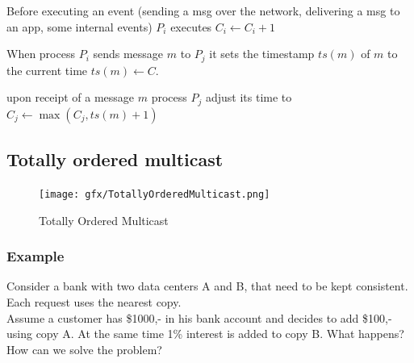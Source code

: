 \documentclass[ngerman,a4paper]{report}
\begin{document}
\begin{compactenum}
\item Before executing an event (sending a msg over the network, delivering a msg to an app, some internal events) $P_i$ executes $C_i \leftarrow C_i + 1$
\item When process $P_i$ sends message $m$ to $P_j$ it sets the timestamp $ts(m)$ of $m$ to the current time $ts(m) \leftarrow C$.
\item upon receipt of a message $m$ process $P_j$ adjust its time to $C_j \leftarrow \max \left({C_j, ts(m)+1}\right)$
\end{compactenum}

\subsection{Totally ordered multicast}

\begin{figure}[h]
	\centering
	\texttt{[image: gfx/TotallyOrderedMulticast.png]}
	\caption{Totally Ordered Multicast}
	\label{img:TotallyOrderedMulticast}
\end{figure}

\subsubsection{Example}

Consider a bank with two data centers A and B, that need to be kept consistent. Each request uses the nearest copy. \\
Assume a customer has \$1000,- in his bank account and decides to add \$100,- using copy A. At the same time 1\% interest is added to copy B. What happens? How can we solve the problem?

\end{document}

